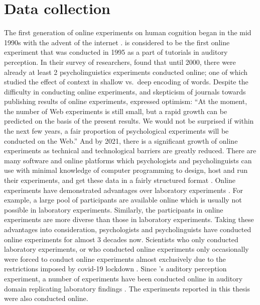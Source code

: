 \documentclass[a4paper, nobind]{templates/ociamthesis}
\begin{document}
\hypertarget{data-collection}{%
\section{Data collection}\label{data-collection}}

The first generation of online experiments on human cognition began in the mid 1990s \autocite[for reviews,][]{Musch2000} with the advent of the internet \autocite{Bernerslee1992}.
\textcite{Welch1996} is considered to be the first online experiment that was conducted in 1995 as a part of tutorials in auditory perception.
In their survey of researchers, \textcite{Musch2000} found that until 2000, there were already at least 2 psycholinguistics experiments conducted online;
one of which studied the effect of context in shallow vs.~deep encoding of words.
Despite the difficulty in conducting online experiments, and skepticism of journals towards publishing results of online experiments,
\textcite{Musch2000} expressed optimism:
``At the moment, the number of Web experiments is still small, but a rapid growth can be predicted on the basis of the present results.
We would not be surprised if within the next few years, a fair proportion of psychological experiments will be conducted on the Web.''
And by 2021, there is a significant growth of online experiments as technical and technological barriers are greatly reduced.
There are many software and online platforms which psychologists and psycholinguists can use with minimal knowledge of computer programming
to design, host and run their experiments, and get these data in a fairly structured format \autocites{Peirce2019,Anwylirvine2020,Prolific}[see also,][]{Anwylirvine2021,Eyal2021}.
Online experiments have demonstrated advantages over laboratory experiments \autocite{Gadiraju2017,Johnson2021}.
For example, a large pool of participants are available online which is usually not possible in laboratory experiments.
Similarly, the participants in online experiments are more diverse than those in laboratory experiments.
Taking these advantages into consideration, psychologists and psycholinguists have conducted online experiments for almost 3 decades now.
Scientists who only conducted laboratory experiments, or who conducted online experiments only occasionally were forced to conduct online experiments almost exclusively due to the restrictions imposed by covid-19 lockdown \autocite{Gagne2021,Reips2021}.
Since \textcite{Welch1996}'s auditory perception experiment, a number of experiments have been conducted online in auditory domain \autocite{Leensen2013,Woods2017,vanOs2021,Seow2022} replicating laboratory findings \autocite[e.g.,][]{Cooke2021}.
The experiments reported in this thesis were also conducted online.
\end{document}
